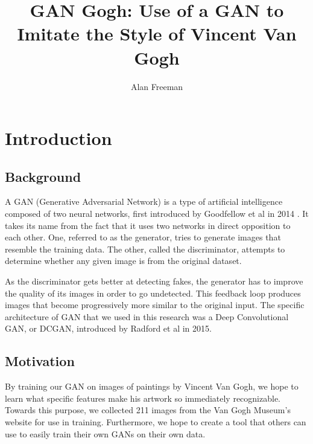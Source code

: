 \documentclass[11pt,letterpaper]{article}
\author{Alan Freeman}
\title{GAN Gogh: Use of a GAN to Imitate the Style of Vincent Van Gogh}
\begin{document}
	\maketitle
	\section{Introduction}
		\subsection{Background}
			A GAN (Generative Adversarial Network) is a type of artificial intelligence composed of two neural networks, first introduced by Goodfellow et al in 2014 \cite{NIPS2014_5ca3e9b1}.
			It takes its name from the fact that it uses two networks in direct opposition to each other.
			One, referred to as the generator, tries to generate images that resemble the training data.
			The other, called the discriminator, attempts to determine whether any given image is from the original dataset.

			As the discriminator gets better at detecting fakes, the generator has to improve the quality of its images in order to go undetected.
			This feedback loop produces images that become progressively more similar to the original input.
			The specific architecture of GAN that we used in this research was a Deep Convolutional GAN, or DCGAN, introduced by Radford et al in 2015\cite{radford2015unsupervised}.
		\subsection{Motivation}
			By training our GAN on images of paintings by Vincent Van Gogh, we hope to learn what specific features make his artwork so immediately recognizable.
			Towards this purpose, we collected 211 images from the Van Gogh Museum's website for use in training.
			Furthermore, we hope to create a tool that others can use to easily train their own GANs on their own data.
\end{document}
